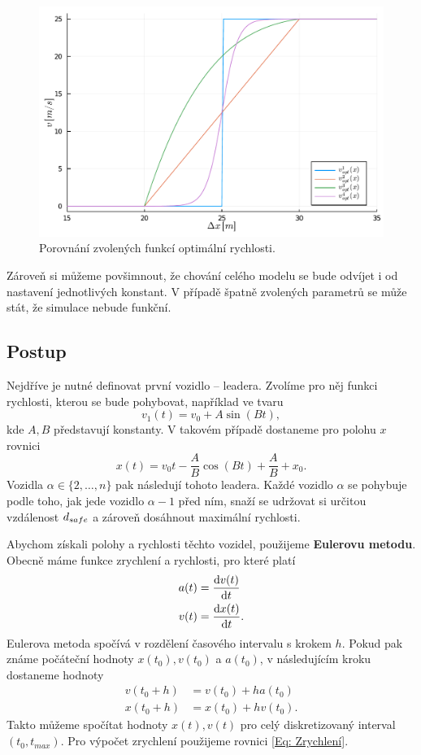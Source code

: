 \documentclass[a4paper, 12pt, fleqn]{article}
\begin{document}
\begin{figure}
	\centering
	\includegraphics[width=\textwidth]{images/opt_funkce.pdf}
	\caption{Porovnání zvolených funkcí optimální rychlosti.}
	\label{Obr: Porovnání opt funkcí}
\end{figure}

Zároveň si můžeme povšimnout, že chování celého modelu se bude odvíjet i od nastavení jednotlivých konstant. V případě špatně zvolených parametrů se může stát, že simulace nebude funkční.

\subsection{Postup}
Nejdříve je nutné definovat první vozidlo -- leadera. Zvolíme pro něj funkci rychlosti, kterou se bude pohybovat, například ve tvaru
\begin{equation}
	v_1(t) = v_0 + A \sin (Bt),\label{Eq. v1}
\end{equation}
kde $A, B$ představují konstanty. V takovém případě dostaneme pro polohu $x$ rovnici
\begin{equation}
	x(t) = v_0t - \frac{A}{B} \cos(Bt) + \frac{A}{B} + x_0.
\end{equation}
Vozidla $\alpha \in \{2, \dots, n \}$ pak následují tohoto leadera. Každé vozidlo $\alpha$ se pohybuje podle toho, jak jede vozidlo $\alpha - 1$ před ním, snaží se udržovat si určitou vzdálenost $d_{safe}$ a zároveň dosáhnout maximální rychlosti.

Abychom získali polohy a rychlosti těchto vozidel, použijeme \textbf{Eulerovu metodu}. Obecně máme funkce zrychlení a rychlosti, pro které platí
\begin{align*}
	a(t) & = \frac{\mathrm{d} v(t)}{\mathrm{d} t} \\
	v(t) & = \frac{\mathrm{d} x(t)}{\mathrm{d} t}.
\end{align*}
Eulerova metoda spočívá v rozdělení časového intervalu s krokem $h$. Pokud pak známe počáteční hodnoty $x(t_0), v(t_0)$ a $a(t_0)$, v následujícím kroku dostaneme hodnoty
\begin{align*}
	v(t_0 + h) & = v(t_0) + ha(t_0) \\
	x(t_0 + h) & = x(t_0) + hv(t_0).
\end{align*}
Takto můžeme spočítat hodnoty $x(t), v(t)$ pro celý diskretizovaný interval $(t_0,t_{max})$. Pro výpočet zrychlení použijeme rovnici \eqref{Eq: Zrychlení}.
\end{document}
